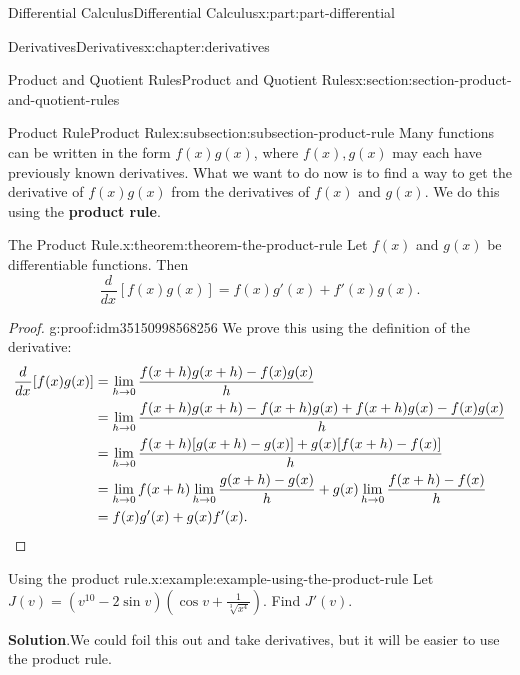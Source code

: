 \documentclass[twoside,10pt,]{book}
\newcommand{\blocktitlefont}{\relax}
\newcommand{\terminology}[1]{\textbf{#1}}
\numberwithin{equation}{part}
\newcommand{\qedhere}{\relax}
\newcommand{\dv}[3][]{\dfrac{d^{#1} #2}{d #3^{#1}}}
\begin{document}
\begin{partptx}{Differential Calculus}{}{Differential Calculus}{}{}{x:part:part-differential}
\begin{chapterptx}{Derivatives}{}{Derivatives}{}{}{x:chapter:derivatives}
\typeout{************************************************}
%
\begin{sectionptx}{Product and Quotient Rules}{}{Product and Quotient Rules}{}{}{x:section:section-product-and-quotient-rules}
%
%
\typeout{************************************************}
\typeout{************************************************}
%
\begin{subsectionptx}{Product Rule}{}{Product Rule}{}{}{x:subsection:subsection-product-rule}
Many functions can be written in the form \(f(x)g(x)\), where \(f(x),g(x)\) may each have previously known derivatives. What we want to do now is to find a way to get the derivative of \(f(x)g(x)\) from the derivatives of \(f(x)\) and \(g(x)\). We do this using the \terminology{product rule}.%
\begin{theorem}{The Product Rule.}{}{x:theorem:theorem-the-product-rule}%
%
Let \(f(x)\) and \(g(x)\) be differentiable functions. Then%
\begin{equation*}
\dv{}{x}[f(x)g(x)] = f(x)g'(x) + f'(x)g(x).
\end{equation*}
%
\end{theorem}
\begin{proof}{}{g:proof:idm35150998568256}
We prove this using the definition of the derivative:%
\begin{align*}
\dv{}{x}[f(x)g(x)] & = \lim_{h\to0}\frac{f(x+h)g(x+h) - f(x)g(x)}{h} \\
& = \lim_{h\to0}\frac{f(x+h)g(x+h) - f(x+h)g(x) + f(x+h)g(x) - f(x)g(x)}{h} \\
& = \lim_{h\to0}\frac{f(x+h)[g(x+h) - g(x)] + g(x)[f(x+h) - f(x)]}{h} \\
& = \lim_{h\to0}f(x+h)\lim_{h\to0}\frac{g(x+h) - g(x)}{h} + g(x)\lim_{h\to0}\frac{f(x+h) - f(x)}{h} \\
& = f(x)g'(x) + g(x)f'(x). \qedhere
\end{align*}
%
\end{proof}
\begin{example}{Using the product rule.}{x:example:example-using-the-product-rule}%
Let \(J(v) = (v^{10} - 2\sin v)(\cos v + \frac{1}{\sqrt[3]{x^{4}}})\). Find \(J'(v)\).%
\par\smallskip%
\noindent\textbf{\blocktitlefont Solution}.\hypertarget{g:solution:idm35150998564544}{}\quad{}We could foil this out and take derivatives, but it will be easier to use the product rule.%
\end{example}

\end{subsectionptx}
\end{sectionptx}
\end{chapterptx}
\end{partptx}
\end{document}
